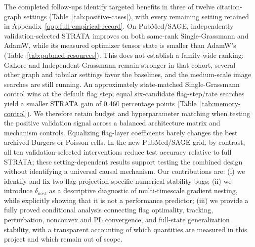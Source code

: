 


The completed follow-ups identify targeted benefits in three of twelve citation-graph settings (Table~\ref{tab:positive-cases}), with every remaining setting retained in Appendix~\ref{app:full-empirical-record}. On PubMed/SAGE, independently validation-selected STRATA improves on both same-rank Single-Grassmann and AdamW, while its measured optimizer tensor state is smaller than AdamW's (Table~\ref{tab:pubmed-resources}). This does not establish a family-wide ranking: GaLore and Independent-Grassmann remain stronger in that cohort, several other graph and tabular settings favor the baselines, and the medium-scale image searches are still running. An approximately state-matched Single-Grassmann control wins at the default flag step; equal six-candidate flag-step/rate searches yield a smaller STRATA gain of 0.460 percentage points (Table~\ref{tab:memory-control}). We therefore retain budget and hyperparameter matching when testing the positive validation signal across a balanced architecture matrix and mechanism controls. Equalizing flag-layer coefficients barely changes the best archived Burgers or Poisson cells. In the new PubMed/SAGE grid, by contrast, all ten validation-selected interventions reduce test accuracy relative to full STRATA; these setting-dependent results support testing the combined design without identifying a universal causal mechanism. Our contributions are: (i) we identify and fix two flag-projection-specific numerical stability bugs; (ii) we introduce $\delta_{\mathrm{nest}}$ as a descriptive diagnostic of multi-timescale gradient nesting, while explicitly showing that it is not a performance predictor; (iii) we provide a fully proved conditional analysis connecting flag optimality, tracking, perturbation, nonconvex and PL convergence, and full-state generalization stability, with a transparent accounting of which quantities are measured in this project and which remain out of scope.
